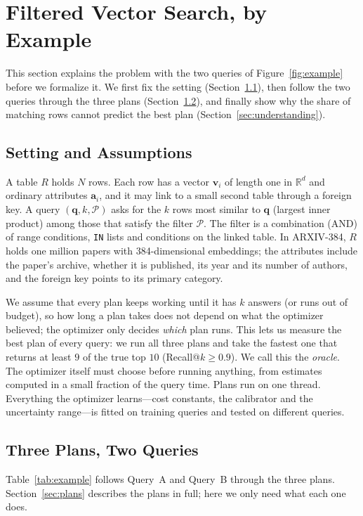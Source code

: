 \documentclass[sigconf, nonacm]{acmart}
\begin{document}
\section{Filtered Vector Search, by Example}\label{sec:example}
This section explains the problem with the two queries of Figure~\ref{fig:example} before we formalize it. We first fix the setting (Section~\ref{sec:setting}), then follow the two queries through the three plans (Section~\ref{sec:plans_example}), and finally show why the share of matching rows cannot predict the best plan (Section~\ref{sec:understanding}).

\subsection{Setting and Assumptions}\label{sec:setting}
A table $R$ holds $N$ rows. Each row has a vector $\mathbf{v}_i$ of length one in $\mathbb{R}^d$ and ordinary attributes $\mathbf{a}_i$, and it may link to a small second table through a foreign key. A query $(\mathbf{q},k,\mathcal{P})$ asks for the $k$ rows most similar to $\mathbf{q}$ (largest inner product) among those that satisfy the filter $\mathcal{P}$. The filter is a combination (AND) of range conditions, \texttt{IN} lists and conditions on the linked table. In ARXIV-384, $R$ holds one million papers with 384-dimensional embeddings; the attributes include the paper's archive, whether it is published, its year and its number of authors, and the foreign key points to its primary category.

We assume that every plan keeps working until it has $k$ answers (or runs out of budget), so how long a plan takes does not depend on what the optimizer believed; the optimizer only decides \emph{which} plan runs. This lets us measure the best plan of every query: we run all three plans and take the fastest one that returns at least $9$ of the true top $10$ (Recall@$k\ge0.9$). We call this the \emph{oracle}. The optimizer itself must choose before running anything, from estimates computed in a small fraction of the query time. Plans run on one thread. Everything the optimizer learns---cost constants, the calibrator and the uncertainty range---is fitted on training queries and tested on different queries.

\subsection{Three Plans, Two Queries}\label{sec:plans_example}
Table~\ref{tab:example} follows Query~A and Query~B through the three plans. Section~\ref{sec:plans} describes the plans in full; here we only need what each one does.
\end{document}

